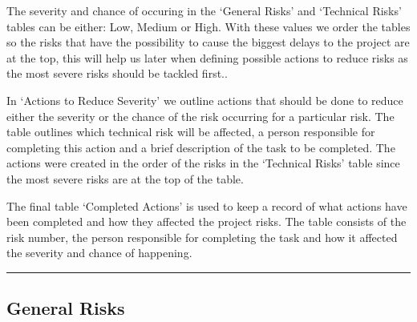 \documentclass[
  english,
  paper=a4,
  oneside  ,captions=tableheading
]{scrbook}
\begin{document}
The severity and chance of occuring in the `General Risks' and
`Technical Risks' tables can be either: Low, Medium or High. With these
values we order the tables so the risks that have the possibility to
cause the biggest delays to the project are at the top, this will help
us later when defining possible actions to reduce risks as the most
severe risks should be tackled first..

In `Actions to Reduce Severity' we outline actions that should be done
to reduce either the severity or the chance of the risk occurring for a
particular risk. The table outlines which technical risk will be
affected, a person responsible for completing this action and a brief
description of the task to be completed. The actions were created in the
order of the risks in the `Technical Risks' table since the most severe
risks are at the top of the table.

The final table `Completed Actions' is used to keep a record of what
actions have been completed and how they affected the project risks. The
table consists of the risk number, the person responsible for completing
the task and how it affected the severity and chance of happening.

\begin{center}\rule{0.5\linewidth}{0.5pt}\end{center}

\hypertarget{general-risks}{%
\subsection{General Risks}\label{general-risks}}
\end{document}
